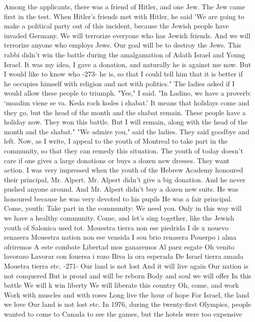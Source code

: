 Among the applicants, there was a friend 
of Hitler, and one Jew.
The Jew came first in the test.
When Hitler's friends met with Hitler, he said 'We are going to make a political party out of this incident, because the Jewish people have 
invaded Germany.
We will terrorize everyone who has Jewish friends.
And we will terrorize anyone who employs Jews.
Our goal will be to 
destroy the Jews.
This rabbi didn't win the battle during the amalgamation of 
Adath Israel and Young Israel.
It was my idea, I gave a donation, 
and naturally he is against me now.
But I would like to know who 
-273- 
he is, so that I could tell him that it is better if he occupies 
himself with religion and not with politics."
The ladies asked if I would allow these people to triumph.
"Yes," I said.
"In Ladino, we have a proverb: ‘moadim viene 
se va.
Keda roch kodes i shabat.'
It means that holidays come 
and they go, but the head of the month and the shabat remain.
These 
people have a holiday now.
They won this battle.
But I will remain, 
along with the head of the month and the shabat."
"We admire you," said the ladies.
They said goodbye and left.
Now, as I write, I appeal to the youth of Montreal to take 
part in the community, so that they can remedy this situation.
The 
youth of today doesn't care if one gives a large donations or buys 
a dozen new dresses.
They want action.
I was very impressed when 
the youth of the Hebrew Academy honoured their principal, Mr.
Alpert.
Mr.
Alpert didn't give a big donation.
And he never pushed anyone around.
And Mr.
Alpert didn't buy a dozen new suits.
He was 
honoured because he was very devoted to his pupils He was a fair 
principal.
Come, youth: Take part in the community: We need you.
Only 
in this way will we have a healthy community.
Come, and let's 
sing together, like the Jewish youth of Salonica used tot.
Mouestra tierra non ese piedrida 
I de x nouevo renasera 
Mouestra nation non ese vensida 
I sou brio renasera 
Pouerpo i alma ofriremos 
A este combate 
Libertad mos ganaremos 
Al paez esgate 
Oh venito lavorozo 
Lavorar con fouersa i rozo 
Biva la ora esperada 
De Israel tierra amada 
Mouetra tierra etc.
-271- 
Our land is not lost 
And it will live again 
Our nation is not conquered 
But is proud and will be reborn 
Body and soul we will offer 
In this battle 
We will k win liberty 
We will liberate this country 
Oh, come, and work 
Work with muscles and with roses 
Long live the hour of hope 
For Israel, the land we love 
Our land is not lost 
etc.
In 1976, during the twenty-first Olympics, people wanted 
to come to Canada to see the games, but the hotels were too expensive 
